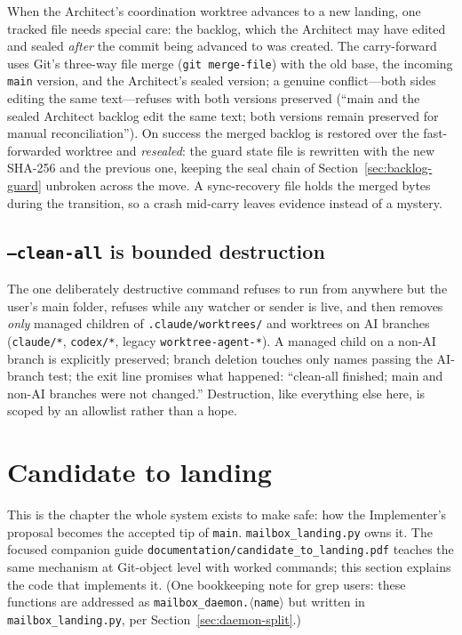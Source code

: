 \documentclass[10pt,aps,prd,twocolumn,nofootinbib]{revtex4-2}
\newcommand{\code}[1]{\texttt{#1}}
\newcommand{\file}[1]{\texttt{#1}}
\begin{document}
When the Architect's coordination worktree advances to a new landing,
one tracked file needs special care: the backlog, which the Architect
may have edited and sealed \emph{after} the commit being advanced to
was created.  The carry-forward uses Git's three-way file merge
(\code{git merge-file}) with the old base, the incoming \code{main}
version, and the Architect's sealed version; a genuine conflict---both
sides editing the same text---refuses with both versions preserved
(``main and the sealed Architect backlog edit the same text; both
versions remain preserved for manual reconciliation'').  On success
the merged backlog is restored over the fast-forwarded worktree and
\emph{resealed}: the guard state file is rewritten with the new
SHA-256 and the previous one, keeping the seal chain of
Section~\ref{sec:backlog-guard} unbroken across the move.  A
sync-recovery file holds the merged bytes during the transition, so a
crash mid-carry leaves evidence instead of a mystery.

\subsection{\code{--clean-all} is bounded destruction}

The one deliberately destructive command refuses to run from anywhere
but the user's main folder, refuses while any watcher or sender is
live, and then removes \emph{only} managed children of
\file{.claude/worktrees/} and worktrees on AI branches
(\code{claude/*}, \code{codex/*}, legacy \code{worktree-agent-*}).  A
managed child on a non-AI branch is explicitly preserved; branch
deletion touches only names passing the AI-branch test; the exit line
promises what happened: ``clean-all finished; main and non-AI branches
were not changed.''  Destruction, like everything else here, is
scoped by an allowlist rather than a hope.

\section{Candidate to landing}
\label{sec:landing}

This is the chapter the whole system exists to make safe: how the
Implementer's proposal becomes the accepted tip of \code{main}.
\file{mailbox\_landing.py} owns it.  The focused companion guide
\file{documentation/candidate\_to\_landing.pdf} teaches the same
mechanism at Git-object level with worked commands; this section
explains the code that implements it.  (One bookkeeping note for
grep users: these functions are addressed as
\code{mailbox\_daemon.$\langle$name$\rangle$} but written in
\file{mailbox\_landing.py}, per Section~\ref{sec:daemon-split}.)
\end{document}
